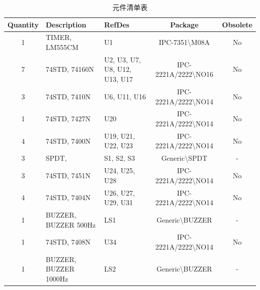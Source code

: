 \begin{table}[hbtp]
	\setlength{\abovecaptionskip}{0cm} 
	\setlength{\belowcaptionskip}{-0.2cm}
	\begin{center}
	\caption{元件清单表}
	\begin{tabular}{|c|p{4cm}<{\centering}|p{2cm}<{\centering}|c|c|}
		\hline
		\textbf{Quantity} & \textbf{Description}  & \textbf{RefDes}               & \textbf{Package}                   & \textbf{Obsolete} \\ \hline
		1                 & TIMER, LM555CM        & U1                            & IPC-7351\textbackslash{}M08A       & No                \\ \hline
		7                 & 74STD, 74160N         & U2, U3, U7, U8, U12, U13, U17 & IPC-2221A/2222\textbackslash{}NO16 & No                \\ \hline
		3                 & 74STD, 7410N          & U6, U11, U16                  & IPC-2221A/2222\textbackslash{}NO14 & No                \\ \hline
		1                 & 74STD, 7427N          & U20                           & IPC-2221A/2222\textbackslash{}NO14 & No                \\ \hline
		4                 & 74STD, 7400N          & U19, U21, U22, U23            & IPC-2221A/2222\textbackslash{}NO14 & No                \\ \hline
		3                 & SPDT,                 & S1, S2, S3                    & Generic\textbackslash{}SPDT        & -                 \\ \hline
		3                 & 74STD, 7451N          & U24, U25, U28                 & IPC-2221A/2222\textbackslash{}NO14 & No                \\ \hline
		4                 & 74STD, 7404N          & U26, U27, U29, U31            & IPC-2221A/2222\textbackslash{}NO14 & No                \\ \hline
		1                 & BUZZER, BUZZER 500Hz  & LS1                           & Generic\textbackslash{}BUZZER      & -                 \\ \hline
		1                 & 74STD, 7408N          & U34                           & IPC-2221A/2222\textbackslash{}NO14 & No                \\ \hline
		1                 & BUZZER, BUZZER 1000Hz & LS2                           & Generic\textbackslash{}BUZZER      & -                 \\ \hline
	\end{tabular} \label{tool}
	\end{center}
\end{table}

